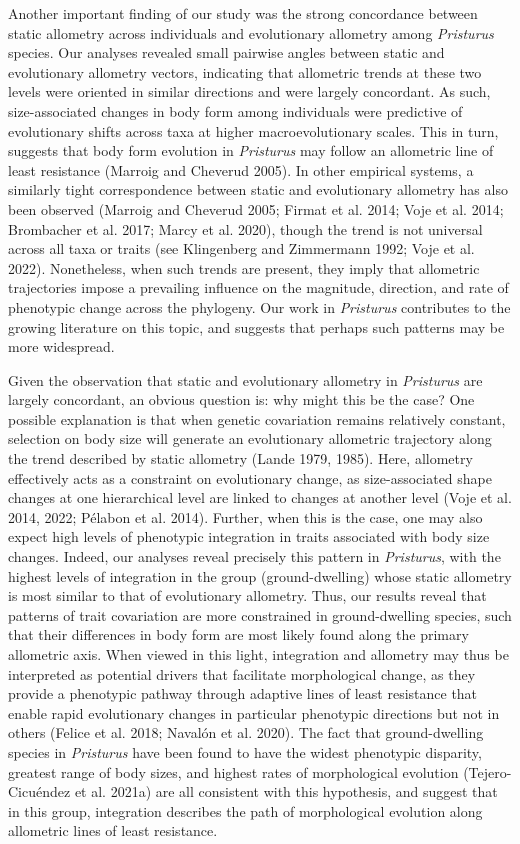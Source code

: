 \documentclass[
  11pt,
]{article}
\begin{document}
Another important finding of our study was the strong concordance
between static allometry across individuals and evolutionary allometry
among \emph{Pristurus} species. Our analyses revealed small pairwise
angles between static and evolutionary allometry vectors, indicating
that allometric trends at these two levels were oriented in similar
directions and were largely concordant. As such, size-associated changes
in body form among individuals were predictive of evolutionary shifts
across taxa at higher macroevolutionary scales. This in turn, suggests
that body form evolution in \emph{Pristurus} may follow an allometric
line of least resistance (Marroig and Cheverud 2005). In other empirical
systems, a similarly tight correspondence between static and
evolutionary allometry has also been observed (Marroig and Cheverud
2005; Firmat et al. 2014; Voje et al. 2014; Brombacher et al. 2017;
Marcy et al. 2020), though the trend is not universal across all taxa or
traits (see Klingenberg and Zimmermann 1992; Voje et al. 2022).
Nonetheless, when such trends are present, they imply that allometric
trajectories impose a prevailing influence on the magnitude, direction,
and rate of phenotypic change across the phylogeny. Our work in
\emph{Pristurus} contributes to the growing literature on this topic,
and suggests that perhaps such patterns may be more
widespread.\hfill\break

Given the observation that static and evolutionary allometry in
\emph{Pristurus} are largely concordant, an obvious question is: why
might this be the case? One possible explanation is that when genetic
covariation remains relatively constant, selection on body size will
generate an evolutionary allometric trajectory along the trend described
by static allometry (Lande 1979, 1985). Here, allometry effectively acts
as a constraint on evolutionary change, as size-associated shape changes
at one hierarchical level are linked to changes at another level (Voje
et al. 2014, 2022; Pélabon et al. 2014). Further, when this is the case,
one may also expect high levels of phenotypic integration in traits
associated with body size changes. Indeed, our analyses reveal precisely
this pattern in \emph{Pristurus}, with the highest levels of integration
in the group (ground-dwelling) whose static allometry is most similar to
that of evolutionary allometry. Thus, our results reveal that patterns
of trait covariation are more constrained in ground-dwelling species,
such that their differences in body form are most likely found along the
primary allometric axis. When viewed in this light, integration and
allometry may thus be interpreted as potential drivers that facilitate
morphological change, as they provide a phenotypic pathway through
adaptive lines of least resistance that enable rapid evolutionary
changes in particular phenotypic directions but not in others (Felice et
al. 2018; Navalón et al. 2020). The fact that ground-dwelling species in
\emph{Pristurus} have been found to have the widest phenotypic
disparity, greatest range of body sizes, and highest rates of
morphological evolution (Tejero-Cicuéndez et al. 2021a) are all
consistent with this hypothesis, and suggest that in this group,
integration describes the path of morphological evolution along
allometric lines of least resistance. \hfill\break
\end{document}

